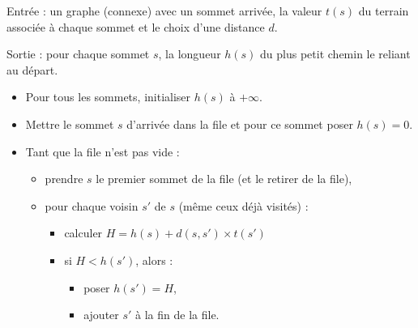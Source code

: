 \documentclass[11pt,class=report,crop=false]{standalone}
\begin{document}
\begin{algorithme}

Entrée : un graphe (connexe) avec un sommet \og{}arrivée\fg{}, la valeur $t(s)$ du terrain associée à chaque sommet et le choix d'une distance $d$.

Sortie : pour chaque sommet $s$, la longueur $h(s)$ du plus petit chemin le reliant au départ.

\begin{itemize}
	\item Pour tous les sommets, initialiser $h(s)$ à $+\infty$.
	
	\item Mettre le sommet $s$ d'\og{}arrivée\fg{} dans la file et pour ce sommet poser $h(s) = 0$.
	
	\item Tant que la file n'est pas vide :
	\begin{itemize}
		\item prendre $s$ le premier sommet de la file (et le retirer de la file),
		\item pour chaque voisin $s'$ de $s$ (même ceux déjà visités) :
		\begin{itemize}
			\item calculer $H = h(s) + d(s,s') \times t(s')$
			\item si $H < h(s')$, alors :
		     \begin{itemize}
	              \item poser $h(s') = H$,
	              \item ajouter $s'$ à la fin de la file.
             \end{itemize}			
		\end{itemize}
	\end{itemize}	
	
\end{itemize}  
\end{algorithme}
\end{document}
